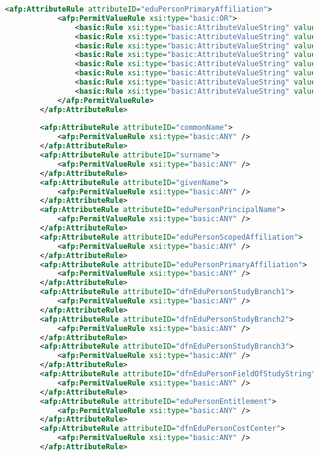\begin{lstlisting}[language=xml]
        <afp:AttributeRule attributeID="eduPersonPrimaryAffiliation">
            <afp:PermitValueRule xsi:type="basic:OR">
                <basic:Rule xsi:type="basic:AttributeValueString" value="faculty" ignoreCase="true" />
                <basic:Rule xsi:type="basic:AttributeValueString" value="student" ignoreCase="true" />
                <basic:Rule xsi:type="basic:AttributeValueString" value="staff" ignoreCase="true" />
                <basic:Rule xsi:type="basic:AttributeValueString" value="alum" ignoreCase="true" />
                <basic:Rule xsi:type="basic:AttributeValueString" value="member" ignoreCase="true" />
                <basic:Rule xsi:type="basic:AttributeValueString" value="affiliate" ignoreCase="true" />
                <basic:Rule xsi:type="basic:AttributeValueString" value="employee" ignoreCase="true" />
                <basic:Rule xsi:type="basic:AttributeValueString" value="library-walk-in" ignoreCase="true" />
            </afp:PermitValueRule>
        </afp:AttributeRule>
        
        <afp:AttributeRule attributeID="commonName">
            <afp:PermitValueRule xsi:type="basic:ANY" />
        </afp:AttributeRule>
        <afp:AttributeRule attributeID="surname">
            <afp:PermitValueRule xsi:type="basic:ANY" />
        </afp:AttributeRule>
        <afp:AttributeRule attributeID="givenName">
            <afp:PermitValueRule xsi:type="basic:ANY" />
        </afp:AttributeRule>
        <afp:AttributeRule attributeID="eduPersonPrincipalName">
            <afp:PermitValueRule xsi:type="basic:ANY" />
        </afp:AttributeRule>
        <afp:AttributeRule attributeID="eduPersonScopedAffiliation">
            <afp:PermitValueRule xsi:type="basic:ANY" />
        </afp:AttributeRule>
        <afp:AttributeRule attributeID="eduPersonPrimaryAffiliation">
            <afp:PermitValueRule xsi:type="basic:ANY" />
        </afp:AttributeRule>
        <afp:AttributeRule attributeID="dfnEduPersonStudyBranch1">
            <afp:PermitValueRule xsi:type="basic:ANY" />
        </afp:AttributeRule>
        <afp:AttributeRule attributeID="dfnEduPersonStudyBranch2">
            <afp:PermitValueRule xsi:type="basic:ANY" />
        </afp:AttributeRule>
        <afp:AttributeRule attributeID="dfnEduPersonStudyBranch3">
            <afp:PermitValueRule xsi:type="basic:ANY" />
        </afp:AttributeRule>
        <afp:AttributeRule attributeID="dfnEduPersonFieldOfStudyString">
            <afp:PermitValueRule xsi:type="basic:ANY" />
        </afp:AttributeRule>
        <afp:AttributeRule attributeID="eduPersonEntitlement">
            <afp:PermitValueRule xsi:type="basic:ANY" />
        </afp:AttributeRule>
        <afp:AttributeRule attributeID="dfnEduPersonCostCenter">
            <afp:PermitValueRule xsi:type="basic:ANY" />
        </afp:AttributeRule>


\end{lstlisting}
